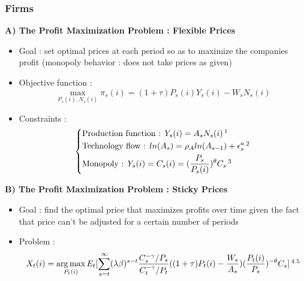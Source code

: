 \documentclass{article}
\DeclareMathOperator*{\argmax}{arg\,max}
\begin{document}

\subsubsection{Firms}

\textbf{A) The Profit Maximization Problem : Flexible Prices}

\begin{itemize}
    \item Goal : set optimal prices at each period so as to maximize the companies profit (monopoly behavior : does not take prices as given)
    \item Objective function : 
    \begin{equation}
        \max_{P_s(i),N_s(i)} \pi_s(i) = (1+\tau)P_s(i)Y_s(i) - W_sN_s(i) 
    \end{equation}
    \item Constraints : 
    \begin{equation}
    \left\{
    \begin{aligned}
        &\text{Production function : }Y_s(i) = A_sN_s(i) \,\footnotemark \\
        &\text{Technology flow : }ln (A_s) = \rho_Aln(A_{s-1}) + \epsilon_s^a \,\footnotemark \\
        &\text{Monopoly : }Y_s(i) = C_s(i) = (\frac{P_s}{P_s(i)})^{\theta}C_s \,\footnotemark
    \end{aligned}
    \right.
    \end{equation}
\end{itemize}


\textbf{B) The Profit Maximization Problem : Sticky Prices}
\begin{itemize}
    \item Goal : find the optimal price that maximizes profits over time given the fact that price can't be adjusted for a certain number of periods
    \item Problem : 
    \begin{equation}
        X_t(i) = \argmax_{P_t(i)} E_t[\sum_{s=t}^\infty (\lambda\beta)^{s-t}\frac{C_s^{-\gamma}/P_s}{C_t^{-\gamma}/P_t}((1+\tau)P_t(i) - \frac{W_s}{A_s})(\frac{P_t(i)}{P_s})^{-\theta}C_s] \,\footnotemark\,\footnotemark
    \end{equation}
\end{itemize}
\end{document}

